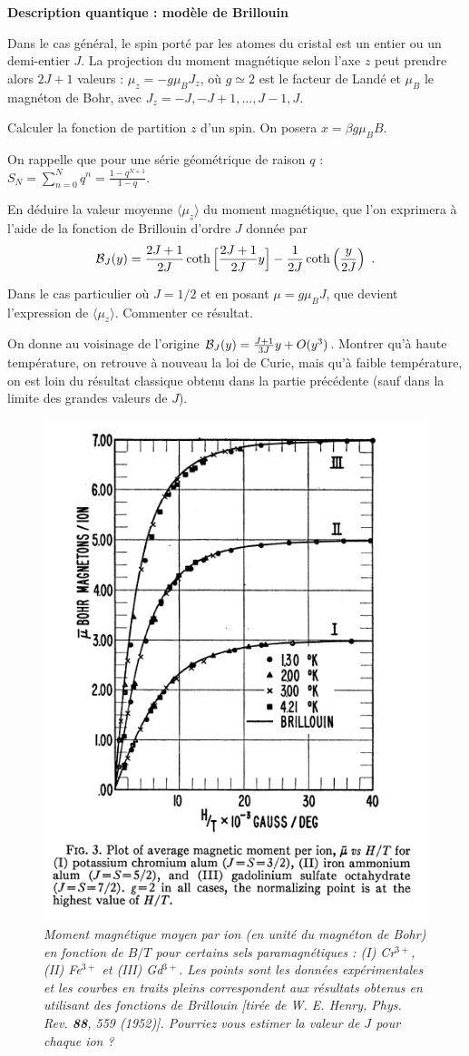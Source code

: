 \medskip

{\sffamily\bfseries{Description quantique : modèle de Brillouin}}

Dans le cas général, le spin porté par les atomes du cristal est un
entier ou un demi-entier $J$. La projection du moment magnétique selon
l'axe $z$ peut prendre alors $2J+1$ valeurs : $\mu_z= -g\mu_B J_z$, où
$g \simeq 2$ est le facteur de Landé et $\mu_B$ le magnéton de Bohr,
avec $J_z=-J, -J+1, \dots,J-1, J$.

\question
Calculer la fonction de partition $z$ d'un spin. On posera $x= \beta g \mu_B B$.

\noindent
On rappelle que pour une série géométrique de raison $q$ : $\displaystyle S_N=\sum_{n=0}^{N} q^n=\frac{1-q^{N+1}}{1-q}$.  

\question
En déduire la valeur moyenne $\langle \mu_z \rangle$ du moment magnétique, que l'on exprimera à l'aide de la fonction de Brillouin d'ordre $J$ donnée par
$$
{\cal B}_J(y)=\frac{2J+1}{2J} \coth \Big[\frac{2J+1}{2J}y\Big]-\frac{1}{2J}\coth \Big(\frac{y}{2J}\Big)\enspace.
$$

\question
Dans le cas particulier où $J=1/2$ et en posant $\mu = g\mu_B J$, que devient l'expression de $\langle \mu_z \rangle$. Commenter ce résultat. 

\question
On donne au voisinage de l'origine  ${\cal B}_J(y)= \frac{J+1}{3J} y+O(y^3)$. Montrer qu'à haute température, on retrouve à nouveau la loi de Curie, mais qu'à faible température, on est loin du résultat classique obtenu dans la partie précédente (sauf dans la limite des grandes valeurs de $J$).

\begin{figure}[h]
\begin{center} 
\includegraphics[height=.5\textwidth]{../Fig/brillouin}
\caption{\it Moment magnétique moyen par ion (en unité du magnéton de Bohr) en fonction de $B/T$ pour certains sels paramagnétiques : (I) Cr$^{3+}$, (II) Fe$^{3+}$ et (III) Gd$^{3+}$.  Les points sont les données expérimentales et les courbes en traits pleins correspondent aux résultats obtenus en utilisant des fonctions de Brillouin [tirée de W. E. Henry, Phys. Rev. \textbf{88}, 559 (1952)]. Pourriez vous estimer la valeur de $J$ pour chaque ion ?}
\end{center} 
\end{figure}
